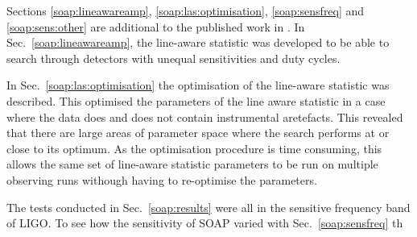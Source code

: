 Sections \ref{soap:lineawareamp}, \ref{soap:las:optimisation}, \ref{soap:sensfreq} and \ref{soap:sens:other} are additional to the published work in \citep{bayley2019SOAPGeneralised}.
In Sec.~\ref{soap:lineawareamp}, the line-aware statistic was developed to be able to search through detectors with unequal sensitivities and duty cycles. 

In Sec.~\ref{soap:las:optimisation} the optimisation of the line-aware statistic was described. 
This optimised the parameters of the line aware statistic in a case where the data does and does not contain instrumental aretefacts.
This revealed that there are large areas of parameter space where the search performs at or close to its optimum. 
As the optimisation procedure is time consuming, this allows the same set of line-aware statistic parameters to be run on multiple observing runs withough having to re-optimise the parameters. 

The tests conducted in Sec.~\ref{soap:results} were all in the sensitive frequency band of \gls{LIGO}. 
To see how the sensitivity of SOAP varied with Sec.~\ref{soap:sensfreq} th

~

